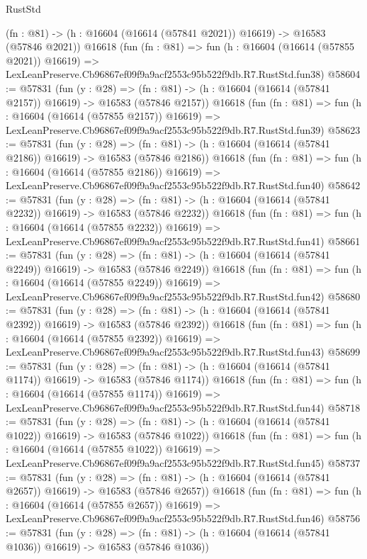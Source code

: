 \begin{lexlean}{RustStd}
\begin{coremodule}
    (fn : @81) -> (h : @16604 (@16614 (@57841 @2021)) @16619) -> @16583 (@57846 @2021))
    @16618
    (fun (fn : @81) =>
    fun (h : @16604 (@16614 (@57855 @2021)) @16619) =>
    LexLeanPreserve.Cb96867ef09f9a9acf2553c95b522f9db.R7.RustStd.fun38)
@58604 := @57831
    (fun (y : @28) =>
    (fn : @81) -> (h : @16604 (@16614 (@57841 @2157)) @16619) -> @16583 (@57846 @2157))
    @16618
    (fun (fn : @81) =>
    fun (h : @16604 (@16614 (@57855 @2157)) @16619) =>
    LexLeanPreserve.Cb96867ef09f9a9acf2553c95b522f9db.R7.RustStd.fun39)
@58623 := @57831
    (fun (y : @28) =>
    (fn : @81) -> (h : @16604 (@16614 (@57841 @2186)) @16619) -> @16583 (@57846 @2186))
    @16618
    (fun (fn : @81) =>
    fun (h : @16604 (@16614 (@57855 @2186)) @16619) =>
    LexLeanPreserve.Cb96867ef09f9a9acf2553c95b522f9db.R7.RustStd.fun40)
@58642 := @57831
    (fun (y : @28) =>
    (fn : @81) -> (h : @16604 (@16614 (@57841 @2232)) @16619) -> @16583 (@57846 @2232))
    @16618
    (fun (fn : @81) =>
    fun (h : @16604 (@16614 (@57855 @2232)) @16619) =>
    LexLeanPreserve.Cb96867ef09f9a9acf2553c95b522f9db.R7.RustStd.fun41)
@58661 := @57831
    (fun (y : @28) =>
    (fn : @81) -> (h : @16604 (@16614 (@57841 @2249)) @16619) -> @16583 (@57846 @2249))
    @16618
    (fun (fn : @81) =>
    fun (h : @16604 (@16614 (@57855 @2249)) @16619) =>
    LexLeanPreserve.Cb96867ef09f9a9acf2553c95b522f9db.R7.RustStd.fun42)
@58680 := @57831
    (fun (y : @28) =>
    (fn : @81) -> (h : @16604 (@16614 (@57841 @2392)) @16619) -> @16583 (@57846 @2392))
    @16618
    (fun (fn : @81) =>
    fun (h : @16604 (@16614 (@57855 @2392)) @16619) =>
    LexLeanPreserve.Cb96867ef09f9a9acf2553c95b522f9db.R7.RustStd.fun43)
@58699 := @57831
    (fun (y : @28) =>
    (fn : @81) -> (h : @16604 (@16614 (@57841 @1174)) @16619) -> @16583 (@57846 @1174))
    @16618
    (fun (fn : @81) =>
    fun (h : @16604 (@16614 (@57855 @1174)) @16619) =>
    LexLeanPreserve.Cb96867ef09f9a9acf2553c95b522f9db.R7.RustStd.fun44)
@58718 := @57831
    (fun (y : @28) =>
    (fn : @81) -> (h : @16604 (@16614 (@57841 @1022)) @16619) -> @16583 (@57846 @1022))
    @16618
    (fun (fn : @81) =>
    fun (h : @16604 (@16614 (@57855 @1022)) @16619) =>
    LexLeanPreserve.Cb96867ef09f9a9acf2553c95b522f9db.R7.RustStd.fun45)
@58737 := @57831
    (fun (y : @28) =>
    (fn : @81) -> (h : @16604 (@16614 (@57841 @2657)) @16619) -> @16583 (@57846 @2657))
    @16618
    (fun (fn : @81) =>
    fun (h : @16604 (@16614 (@57855 @2657)) @16619) =>
    LexLeanPreserve.Cb96867ef09f9a9acf2553c95b522f9db.R7.RustStd.fun46)
@58756 := @57831
    (fun (y : @28) =>
    (fn : @81) -> (h : @16604 (@16614 (@57841 @1036)) @16619) -> @16583 (@57846 @1036))

\end{coremodule}
\end{lexlean}
